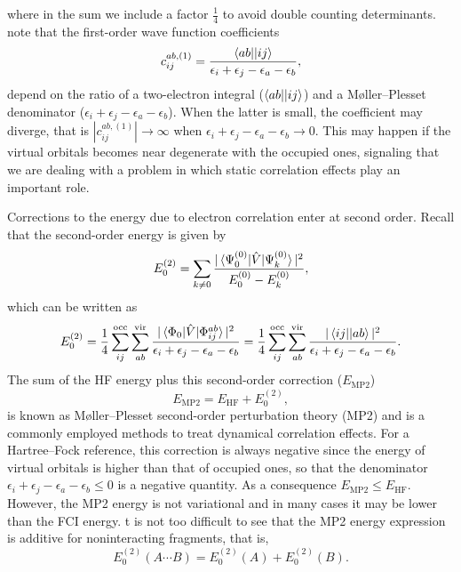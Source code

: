 \documentclass[../Main/chem532-notes.tex]{subfiles}
\begin{document}
where in the sum we include a factor $\frac{1}{4}$ to avoid double counting determinants.
note that the first-order wave function coefficients
\begin{equation}
c_{ij}^{ab,(1)} =  \frac{\bra{ab}\!\ket{ij}}{\epsilon_i + \epsilon_j - \epsilon_a - \epsilon_b},
\end{equation}
depend on the ratio of a two-electron integral ($\bra{ab}\!\ket{ij}$) and a M{\o}ller--Plesset denominator ($\epsilon_i + \epsilon_j - \epsilon_a - \epsilon_b$). When the latter is small, the coefficient may diverge, that is $|c_{ij}^{ab,(1)}| \rightarrow \infty$ when $\epsilon_i + \epsilon_j - \epsilon_a - \epsilon_b \rightarrow 0.$
This may happen if the virtual orbitals becomes near degenerate with the occupied ones, signaling that we are dealing with a problem in which static correlation effects play an important role.

Corrections to the energy due to electron correlation enter at second order.
Recall that the second-order energy is given by
\begin{equation}
E^{(2)}_0 = \sum_{k \neq 0}\frac{|\braket{\Psi_0^{(0)}|\hat{V}|\Psi_k^{(0)}}|^2}{E_0^{(0)} - E_k^{(0)}},
\end{equation}
which can be written as
\begin{equation}
E^{(2)}_0 = \frac{1}{4} \sum_{ij}^{\mathrm{occ}} \sum_{ab}^{\mathrm{vir}} 
\frac{ |\braket{\Phi_0|\hat{V}|\Phi_{ij}^{ab}}|^2}{\epsilon_i + \epsilon_j - \epsilon_a - \epsilon_b}
= \frac{1}{4} \sum_{ij}^{\mathrm{occ}} \sum_{ab}^{\mathrm{vir}} 
\frac{ |\bra{ij}\!\ket{ab}|^2}{\epsilon_i + \epsilon_j - \epsilon_a - \epsilon_b}.
\end{equation}
The sum of the HF energy plus this second-order correction ($E_{\mathrm{MP2}}$)
\begin{equation}
E_{\mathrm{MP2}} = E_{\mathrm{HF}} + E^{(2)}_0,
\end{equation}
is known as M{\o}ller--Plesset second-order perturbation theory (MP2) and is a commonly employed methods to treat dynamical correlation effects.
For a Hartree--Fock reference, this correction is always negative since the energy of virtual orbitals is higher than  that of occupied ones, so that the denominator $\epsilon_i + \epsilon_j - \epsilon_a - \epsilon_b \leq 0$ is a negative quantity.
As a consequence $E_{\mathrm{MP2}} \leq E_{\mathrm{HF}}$. However, the MP2 energy is not variational and in many cases it may be lower than the FCI energy.
 t is not too difficult to see that the MP2 energy expression is additive for noninteracting fragments, that is,
 \begin{equation}
E^{(2)}_0(A\cdots B) = E^{(2)}_0(A) + E^{(2)}_0(B).
\end{equation}
\end{document}
